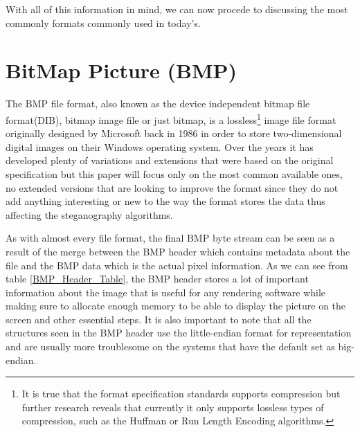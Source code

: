 \begin{multicols}{2}
With all of this information in mind, we can now procede to discussing the most commonly formats commonly used in today's.

\section{BitMap Picture (BMP)} \label{BMP_Explained_Chapter}

The BMP file format, also known as the device independent bitmap file format(DIB), bitmap image file or just bitmap, is a lossless\footnote{It is true that the format specification standards supports compression but further research reveals that currently it only supports lossless types of compression, such as the Huffman or Run Length Encoding algorithms.} image file format originally designed by Microsoft back in 1986 in order to store two-dimensional digital images on their Windows operating system. Over the years it has developed plenty of variations and extensions that were based on the original specification but this paper will focus only on the most common available ones, no extended versions that are looking to improve the format since they do not add anything interesting or new to the way the format stores the data thus affecting the steganography algorithms.

As with almost every file format, the final BMP byte stream can be seen as a result of the merge between the BMP header which contains metadata about the file and the BMP data which is the actual pixel information. As we can see from table \ref{BMP_Header_Table}, the BMP header stores a lot of important information about the image that is useful for any rendering software while making sure to allocate enough memory to be able to display the picture on the screen and other essential steps. It is also important to note that all the structures seen in the BMP header use the little-endian format for representation and are usually more troublesome on the systems that have the default set as big-endian.
\end{multicols}

